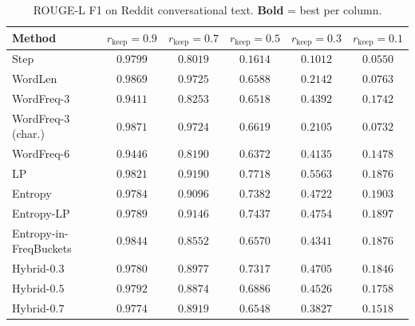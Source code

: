 \documentclass[11pt]{article}
\newcommand{\rkeep}{r_{\mathrm{keep}}}
\begin{document}
\begin{table}[tbp]
\centering
\small
\caption{ROUGE-L F1 on Reddit conversational text.
\textbf{Bold} = best per column.}
\label{tab:reddit_rougeL}
\begin{tabular}{lccccc}
\toprule
\textbf{Method} & $\rkeep{=}0.9$ & $\rkeep{=}0.7$ & $\rkeep{=}0.5$ & $\rkeep{=}0.3$ & $\rkeep{=}0.1$ \\
\midrule
Step              & $0.9799$ & $0.8019$ & $0.1614$ & $0.1012$ & $0.0550$ \\
WordLen           & $0.9869$ & $\mathbf{0.9725}$ & $0.6588$ & $0.2142$ & $0.0763$ \\
WordFreq-3         & $0.9411$ & $0.8253$ & $0.6518$ & $0.4392$ & $0.1742$ \\
WordFreq-3 (char.) & $\mathbf{0.9871}$ & $0.9724$ & $0.6619$ & $0.2105$ & $0.0732$ \\
WordFreq-6         & $0.9446$ & $0.8190$ & $0.6372$ & $0.4135$ & $0.1478$ \\
LP            & $0.9821$ & $0.9190$ & $\mathbf{0.7718}$ & $\mathbf{0.5563}$ & $0.1876$ \\
Entropy           & $0.9784$ & $0.9096$ & $0.7382$ & $0.4722$ & $\mathbf{0.1903}$ \\
Entropy-LP        & $0.9789$ & $0.9146$ & $0.7437$ & $0.4754$ & $0.1897$ \\
Entropy-in-FreqBuckets & $0.9844$ & $0.8552$ & $0.6570$ & $0.4341$ & $0.1876$ \\
Hybrid-$0.3$      & $0.9780$ & $0.8977$ & $0.7317$ & $0.4705$ & $0.1846$ \\
Hybrid-$0.5$      & $0.9792$ & $0.8874$ & $0.6886$ & $0.4526$ & $0.1758$ \\
Hybrid-$0.7$      & $0.9774$ & $0.8919$ & $0.6548$ & $0.3827$ & $0.1518$ \\
\bottomrule
\end{tabular}
\end{table}
\end{document}
